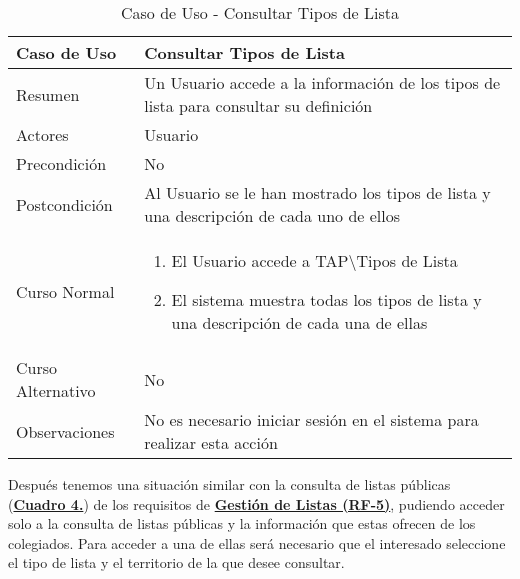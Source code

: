 \begin{table}[!htbp]
  \centering  \addtocounter{casouso}{1}
  \begin{tabular}{|l | p{100mm}|}
    \textbf{Caso de Uso}  & \textbf{Consultar Tipos de Lista} \\ \hline
    Resumen 		 & Un Usuario accede a la información de los tipos de lista para consultar su definición \\ \hline
    Actores  		 & Usuario \\ \hline
    Precondición  	 & No \\ \hline
    Postcondición  	 & Al Usuario se le han mostrado los tipos de lista y una descripción de cada uno de ellos \\ \hline
    Curso Normal   	 & \begin{enumerate}
	  \item El Usuario accede a TAP\textbackslash Tipos de Lista
	  \item El sistema muestra todas los tipos de lista y una descripción de cada una de ellas
    \end{enumerate}  \\ \hline
    Curso Alternativo  & No  \\ \hline
    Observaciones 	 & No es necesario iniciar sesión en el sistema para realizar esta acción  \\ \hline
  \end{tabular}
  \caption{Caso de Uso  - Consultar Tipos de Lista}
  \label{tab:cuuConsultaTiposLst}
\end{table}
\FloatBarrier

\addtocounter{tabla}{1}
Después tenemos una situación similar con la consulta de listas públicas (\textbf{\hyperref[tab:cuuConsultaLstPub]{Cuadro 4.}}) de los requisitos de \textbf{\hyperref[tab:rfGestLst]{Gestión de Listas (RF-5)}}, pudiendo acceder solo a la consulta de listas públicas y la información que estas ofrecen de los colegiados. Para acceder a una de ellas será necesario que el interesado seleccione el tipo de lista y el territorio de la que desee consultar.

